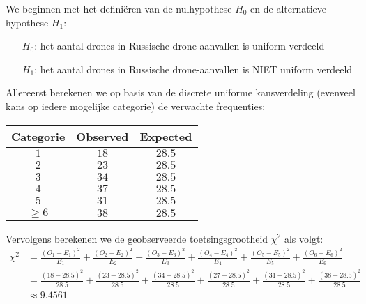 \begin{question}{20}
{        We beginnen met het definiëren van de nulhypothese $H_0$ en de alternatieve hypothese $H_1$:
        \begin{itemize}
            \item[$H_0$: ] het aantal drones in Russische drone-aanvallen is uniform verdeeld 
            \item[$H_1$: ] het aantal drones in Russische drone-aanvallen is NIET uniform verdeeld 
        \end{itemize}
        Allereerst berekenen we op basis van de discrete uniforme kansverdeling (evenveel kans op iedere mogelijke categorie) de verwachte frequenties:
        \begin{center}
            \begin{tabular}{ccc}
                \toprule
                    \textbf{Categorie} & \textbf{Observed} & \textbf{Expected} \\
                \midrule
                    $1$ & $18$ & $28.5$ \\
                    $2$ & $23$ & $28.5$ \\
                    $3$ & $34$ & $28.5$ \\
                    $4$ & $37$ & $28.5$ \\
                    $5$ & $31$ & $28.5$ \\
                    $\geq 6$ & $38$ & $28.5$ \\ 
                \bottomrule
            \end{tabular}
        \end{center}
    
        Vervolgens berekenen we de geobserveerde toetsingsgrootheid $\chi^2$ als volgt:
       \begin{align*}
            \chi^2 &= \frac{(O_{1} - E_{1})^2}{E_{1}} + \frac{(O_{2} - E_{2})^2}{E_{2}} + \frac{(O_{3} - E_{3})^2}{E_{3}} + \frac{(O_{4} - E_{4})^2}{E_{4}} + \frac{(O_{5} - E_{5})^2}{E_{5}} + \frac{(O_{6} - E_{6})^2}{E_{6}}\\
                &= \frac{(18 - 28.5)^2}{28.5} + \frac{(23 - 28.5)^2}{28.5} + \frac{(34 - 28.5)^2}{28.5} + \frac{(27 - 28.5)^2}{28.5} + \frac{(31 - 28.5)^2}{28.5} + \frac{(38 - 28.5)^2}{28.5}\\
                &\approx 9.4561
    \end{align*}
    
}
\end{question}
